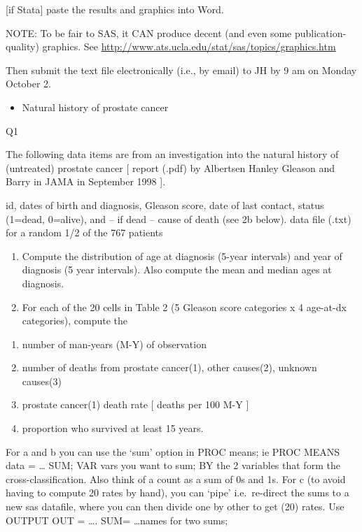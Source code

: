 \documentclass[]{book}
\providecommand{\tightlist}{%
  \setlength{\itemsep}{0pt}\setlength{\parskip}{0pt}}
\begin{document}
{[}if Stata{]} paste the results and graphics into Word.

NOTE: To be fair to SAS, it CAN produce decent (and even some publication-quality) graphics. See \url{http://www.ats.ucla.edu/stat/sas/topics/graphics.htm}

Then submit the text file electronically (i.e., by email) to JH by 9 am on Monday October 2.

\begin{itemize}
\tightlist
\item
  Natural history of prostate cancer
\end{itemize}

Q1

The following data items are from an investigation into the natural history of (untreated) prostate cancer {[} report (.pdf) by Albertsen Hanley Gleason and Barry in JAMA in September 1998 {]}.

id, dates of birth and diagnosis, Gleason score, date of last contact, status (1=dead, 0=alive), and -- if dead -- cause of death (see 2b below). data file (.txt) for a random 1/2 of the 767 patients

\begin{enumerate}
\def\labelenumi{\arabic{enumi}.}
\item
  Compute the distribution of age at diagnosis (5-year intervals) and year of diagnosis (5 year intervals). Also compute the mean and median ages at diagnosis.
\item
  For each of the 20 cells in Table 2 (5 Gleason score categories x 4 age-at-dx categories), compute the
\end{enumerate}

\begin{enumerate}
\def\labelenumi{\alph{enumi}.}
\item
  number of man-years (M-Y) of observation
\item
  number of deaths from prostate cancer(1), other causes(2), unknown causes(3)
\item
  prostate cancer(1) death rate {[} deaths per 100 M-Y {]}
\item
  proportion who survived at least 15 years.
\end{enumerate}

For a and b you can use the `sum' option in PROC means;
ie PROC MEANS data = \ldots{} SUM; VAR vars you want to sum;
BY the 2 variables that form the cross-classification.
Also think of a count as a sum of 0s and 1s.
For c (to avoid having to compute 20 rates by hand), you can `pipe' i.e.~re-direct the sums to a new sas datafile, where you can then divide one by other to get (20) rates. Use OUTPUT OUT = \ldots{}. SUM= \ldots{}names for two sums;
\end{document}

